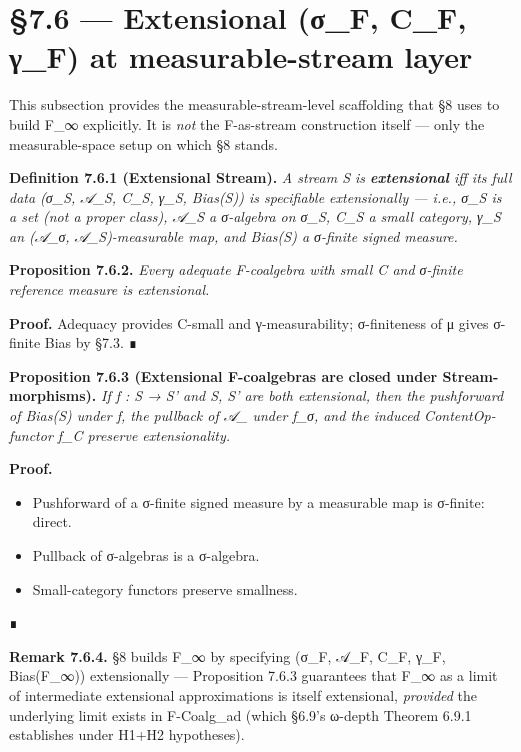 \documentclass[11pt, openany]{book}
\newcommand{\sectionbreak}{\clearpage}
\begin{document}
\sectionbreak

\section{§7.6 --- Extensional (σ\_\allowbreak{}F, C\_\allowbreak{}F, γ\_\allowbreak{}F) at measurable-stream layer}

This subsection provides the measurable-stream-level scaffolding that §8 uses to build F\_\allowbreak{}∞ explicitly. It is \textit{not} the F-as-stream construction itself --- only the measurable-space setup on which §8 stands.

\textbf{Definition 7.6.1 (Extensional Stream).} \textit{A stream S is \textbf{extensional} iff its full data (σ\_\allowbreak{}S, 𝒜\_\allowbreak{}S, C\_\allowbreak{}S, γ\_\allowbreak{}S, Bias(S)) is specifiable extensionally --- i.e., σ\_\allowbreak{}S is a set (not a proper class), 𝒜\_\allowbreak{}S a σ-algebra on σ\_\allowbreak{}S, C\_\allowbreak{}S a small category, γ\_\allowbreak{}S an (𝒜\_\allowbreak{}σ, 𝒜\_\allowbreak{}S)-measurable map, and Bias(S) a σ-finite signed measure.}

\textbf{Proposition 7.6.2.} \textit{Every adequate F-coalgebra with small C and σ-finite reference measure is extensional.}

\textbf{Proof.} Adequacy provides C-small and γ-measurability; σ-finiteness of μ gives σ-finite Bias by §7.3. ∎

\textbf{Proposition 7.6.3 (Extensional F-coalgebras are closed under Stream-morphisms).} \textit{If f : S → S' and S, S' are both extensional, then the pushforward of Bias(S) under f, the pullback of 𝒜\_ under f\_\allowbreak{}σ, and the induced ContentOp-functor f\_\allowbreak{}C preserve extensionality.}

\textbf{Proof.}
\begin{itemize}
\item Pushforward of a σ-finite signed measure by a measurable map is σ-finite: direct.
\item Pullback of σ-algebras is a σ-algebra.
\item Small-category functors preserve smallness.
\end{itemize}
∎

\textbf{Remark 7.6.4.} §8 builds F\_\allowbreak{}∞ by specifying (σ\_\allowbreak{}F, 𝒜\_\allowbreak{}F, C\_\allowbreak{}F, γ\_\allowbreak{}F, Bias(F\_\allowbreak{}∞)) extensionally --- Proposition 7.6.3 guarantees that F\_\allowbreak{}∞ as a limit of intermediate extensional approximations is itself extensional, \textit{provided} the underlying limit exists in F-Coalg\_\allowbreak{}ad (which §6.9's ω-depth Theorem 6.9.1 establishes under H1+H2 hypotheses).
\end{document}
